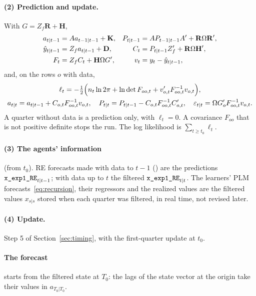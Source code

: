 \documentclass[11pt,a4paper]{article}
\DeclareRobustCommand{\codem}[1]{\texttt{\detokenize{#1}}}
\newcommand{\K}{\mathbf{K}}
\newcommand{\Rs}{\mathbf{R}}
\newcommand{\Hs}{\mathbf{H}}
\newcommand{\D}{\mathbf{D}}
\newcommand{\transp}{^{\prime}}
\begin{document}
\paragraph{(2) Prediction and update.} With $G = Z_f\Rs + \Hs$,
\begin{align}
  a_{t|t-1} &= A a_{t-1|t-1} + \K, & P_{t|t-1} &= A P_{t-1|t-1} A\transp + \Rs\Omega\Rs\transp, \notag\\
  \hat y_{t|t-1} &= Z_f a_{t|t-1} + \D, & C_t &= P_{t|t-1}Z_f\transp + \Rs\Omega\Hs\transp, \notag\\
  F_t &= Z_f C_t + \Hs\Omega G\transp, & v_t &= y_t - \hat y_{t|t-1}, \label{eq:kalman}
\end{align}
and, on the rows $o$ with data,
\begin{gather}
  \ell_t = -\tfrac12\Bigl(n_t\ln 2\pi + \ln\det F_{oo,t} + v_{o,t}\transp F_{oo,t}^{-1}v_{o,t}\Bigr),\\
  a_{t|t} = a_{t|t-1} + C_{o,t}F_{oo,t}^{-1}v_{o,t},\quad
  P_{t|t} = P_{t|t-1} - C_{o,t}F_{oo,t}^{-1}C_{o,t}\transp,\quad
  \varepsilon_{t|t} = \Omega G_o\transp F_{oo,t}^{-1}v_{o,t}.
\end{gather}
A quarter without data is a prediction only, with $\ell_t = 0$. A covariance $F_{oo}$ that is not
positive definite stops the run. The log likelihood is $\sum_{t\ge t_0}\ell_t$.

\paragraph{(3) The agents' information} (from $t_0$). RE forecasts made with data to $t-1$
() are the predictions $\codem{x_exp1_RE}_{t|t-1}$; with data up to $t$ the
filtered $\codem{x_exp1_RE}_{t|t}$. The learners' PLM forecasts~\eqref{eq:recursion}, their
regressors and the realized values are the filtered values $x_{s|s}$ stored when each quarter was
filtered, in real time, not revised later.

\paragraph{(4) Update.} Step 5 of Section~\ref{sec:timing}, with the first-quarter update at
$t_0$.

\paragraph{The forecast} starts from the filtered state at $T_0$: the lags of the state vector at
the origin take their values in $a_{T_0|T_0}$.
\end{document}
